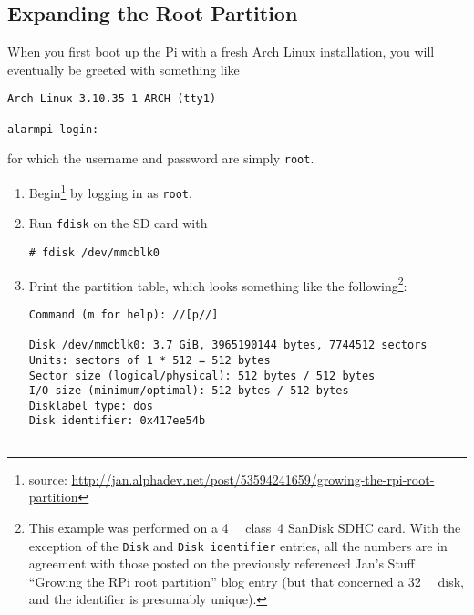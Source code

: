 \documentclass[12pt,letterpaper]{article}
\begin{document}

\subsection{Expanding the Root Partition}

When you first boot up the Pi with a fresh Arch Linux installation, you will eventually be greeted with something like

\begin{lstlisting}
Arch Linux 3.10.35-1-ARCH (tty1)

alarmpi login:
\end{lstlisting}
for which the username and password are simply \lstinline{root}.

\begin{enumerate}
\item Begin\footnote{%
source:
\url{http://jan.alphadev.net/post/53594241659/growing-the-rpi-root-partition}} by logging in as \lstinline{root}.

\item Run \lstinline{fdisk} on the SD card with
\begin{lstlisting}
# fdisk /dev/mmcblk0
\end{lstlisting}

\item
Print the partition table, which looks something like the following\footnote{This example was performed on a \SI{4}{\giga\byte} class~4 SanDisk SDHC card.  With the exception of the \lstinline{Disk} and \lstinline{Disk identifier} entries, all the numbers are in agreement with those posted on the previously referenced Jan's Stuff ``Growing the RPi root partition'' blog entry (but that concerned a \SI{32}{\giga\byte} disk, and the identifier is presumably unique).}:


\begin{lstlisting}[basicstyle=\ttfamily\footnotesize]
Command (m for help): //[p//]

Disk /dev/mmcblk0: 3.7 GiB, 3965190144 bytes, 7744512 sectors
Units: sectors of 1 * 512 = 512 bytes
Sector size (logical/physical): 512 bytes / 512 bytes
I/O size (minimum/optimal): 512 bytes / 512 bytes
Disklabel type: dos
Disk identifier: 0x417ee54b


\end{lstlisting}
\end{enumerate}
\end{document}
